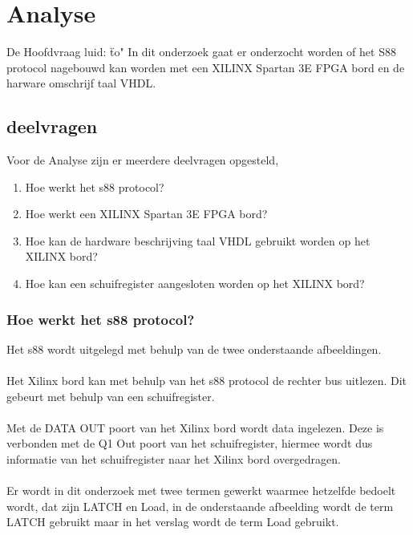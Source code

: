 \chapter{Analyse}
De Hoofdvraag luid:
\"to"
In dit onderzoek gaat er onderzocht worden of het S88 protocol nagebouwd kan worden met een XILINX Spartan 3E FPGA bord en de harware omschrijf taal VHDL.
\section{deelvragen}
Voor de Analyse zijn er meerdere deelvragen opgesteld,

\begin{enumerate}
	\item Hoe werkt het s88 protocol?
	\item Hoe werkt een XILINX Spartan 3E FPGA bord?
	\item Hoe kan de hardware beschrijving taal VHDL gebruikt worden op het XILINX bord?
	\item Hoe kan een schuifregister aangesloten worden op het XILINX bord?
\end{enumerate}

\subsection{Hoe werkt het s88 protocol?}
Het s88 wordt uitgelegd met behulp van de twee onderstaande afbeeldingen.
\\\\
Het Xilinx bord kan met behulp van het s88 protocol de rechter bus uitlezen. Dit gebeurt met behulp van een schuifregister.
\\\\
Met de DATA OUT poort van het Xilinx bord wordt data ingelezen. Deze is verbonden met de Q1 Out poort van het schuifregister, hiermee wordt dus informatie van het schuifregister naar het Xilinx bord overgedragen.
\\\\
Er wordt in dit onderzoek met twee termen gewerkt waarmee hetzelfde bedoelt wordt, dat zijn LATCH en Load, in de onderstaande afbeelding wordt de term LATCH gebruikt maar in het verslag wordt de term Load gebruikt.\\\\


